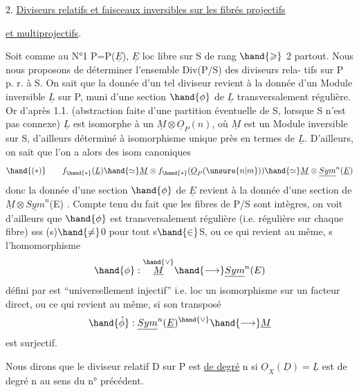 
2. \uline{Diviseurs relatifs et faisceaux inversibles sur les fibrés projectifs}

\uline{et multiprojectifs}.

 Soit comme au N°1 P=P($\underline{E}$), $\underline{E}$ loc libre sur S de rang $\hand{\geqslant}$ 2 partout.
Nous nous proposons de déterminer l'ensemble Div(P/S) des diviseurs rela-%
tifs  sur P p. r. à S. On sait que la donnée d'un tel diviseur revient à la
donnée d'un Module inversible $\underline{L}$ sur P, muni d'une section $\hand{\phi}$ de $\underline{L}$
transversalement régulière. Or d'après 1.1. (abstraction faite d'une
partition éventuelle de S, lorsque S n'est pas connexe) $\underline{L}$ est isomorphe
à un $\underline{M}\otimes\underline{O}_P(n)$, où $\underline{M}$ est un Module inversible sur S, d'ailleurs déterminé
à isomorphisme unique près en termes de $\underline{L}$. D'ailleurs, on sait que
l'on a alors des isom canoniques
\[ \hand{(*)} \qquad f_{\hand{*}}(\underline{L}) \hand{\simeq} \underline{M}\otimes f_{\hand{*}}(\underline{O}_P(\unsure{n|m})) \hand{\simeq} \underline{M}\otimes\underline{Sym}^n(\underline{E}) \]
donc la donnée d'une section  $\hand{\phi}$ de $\underline{E}$ revient à la donnée d'une section
\inserted{$\phi$} de $\underline{M}\otimes\underline{Sym}^n$(E) . Compte tenu du fait que les fibres de P/S sont intègres,
on voit d'ailleurs que $\hand{\phi}$ est transversalement régulière (i.e. régulière
sur chaque fibre) sss \hand{$\phi$}(s)$\hand{\neq}$0 pour tout s$\hand{\in}$S, ou ce qui revient au même,
s l'homomorphisme
\[ \hand{\phi} : \overset{\hand{\vee}}{\underline{M}} \hand{\longrightarrow} \underline{Sym}^n(E) \]
défini par \hand{$\phi$} est ``universellement injectif'' i.e. loc un isomorphisme sur
un facteur direct, ou ce qui revient au même, si son transposé
\[ \hand{\check{\phi}} : \underline{Sym}^n(\underline{E})^{\hand{\vee}} \hand{\longrightarrow} \underline{M} \]
est surjectif.

Nous dirons que le diviseur relatif D sur P est \uline{de degré} n
si $\underline{O}_X(\underline{D})= \underline{L}$ est de degré n au sens du n° précédent. 

